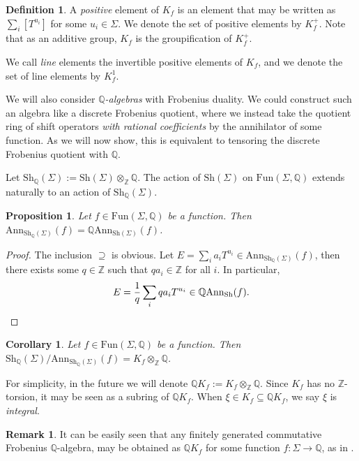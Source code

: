 \documentclass[oneside]{amsart}
\theoremstyle{plain}
\newtheorem{proposition}[theorem]{Proposition}
\newtheorem{corollary}[theorem]{Corollary}
\theoremstyle{definition}
\newtheorem{definition}[theorem]{Definition}
\newtheorem{remark}[theorem]{Remark}
\newcommand{\Z}{{\mathbb{Z}}}
\newcommand{\Q}{{\mathbb{Q}}}
\newcommand{\Ann}{{\mathrm{Ann}}}
\newcommand{\Fun}{{\mathrm{Fun}}}
\newcommand{\Sh}{{\mathrm{Sh}}}
\begin{document}
\begin{definition}
A \emph{positive} element of $K_f$ is an element that may be written as $\sum_i [T^{u_i}]$ for some $u_i \in \Sigma$. We denote the set of positive elements by $K_f^+$. Note that as an additive group, $K_f$ is the groupification of $K_f^+$.

We call \emph{line} elements the invertible positive elements of $K_f$,
and we denote the set of line elements by
$K_f^1$.
\end{definition}

We will also consider \emph{$\Q$-algebras} with Frobenius duality. We could construct such an algebra like a discrete Frobenius quotient, where we instead take the quotient ring of shift operators \emph{with rational coefficients} by the annihilator of some function. As we will now show, this is equivalent to tensoring the discrete Frobenius quotient with $\Q$.

Let $\Sh_\Q(\Sigma) := \Sh(\Sigma) \otimes_\Z \Q$. The action of $\Sh(\Sigma)$ on $\Fun(\Sigma, \Q)$ extends naturally to an action of $\Sh_\Q(\Sigma)$.

\begin{proposition}
\label{prop:ann-sh-rational}
    Let $f \in \Fun(\Sigma, \Q)$ be a function.
    Then
    $\Ann_{\Sh_\Q(\Sigma)}(f) = \Q\Ann_{\Sh(\Sigma)}(f)$.
\end{proposition}

\begin{proof}
The inclusion $\supseteq$ is obvious. Let $E = \sum_{i}a_iT^{u_i} \in \Ann_{\Sh_\Q(\Sigma)}(f)$, then there exists some $q \in \Z$ such that $qa_i \in \Z$ for all $i$. In particular,
\[
E = \frac{1}{q}\sum_{i} qa_i T^{u_i} \in \Q \Ann_{\Sh}(f).
\qedhere
\]
\end{proof}

\begin{corollary}
    Let $f \in \Fun(\Sigma, \Q)$ be a function.
    Then $\Sh_\Q(\Sigma)/\Ann_{\Sh_\Q(\Sigma)}(f) = K_f \otimes_\Z \Q$.
\end{corollary}

For simplicity, in the future we will denote $\Q K_f := K_f \otimes_\Z \Q$. 
Since $K_f$ has no $\Z$-torsion, it may be seen as a subring of $\Q K_f$. When $\xi \in K_f \subseteq \Q K_f$, we say $\xi$ is \emph{integral}.

\begin{remark}
    It can be easily seen that any finitely generated commutative Frobenius $\Q$-algebra, may be obtained as $\Q K_f$ for some function $f: \Sigma \to \Q$, as in .
\end{remark}
\end{document}
